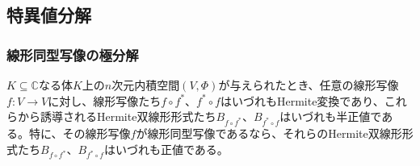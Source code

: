 \documentclass[dvipdfmx]{jsarticle}
\begin{document}
\subsection{特異値分解}%
\subsubsection{線形同型写像の極分解}%
\begin{thm}\label{2.3.11.1}
$K \subseteq \mathbb{C}$なる体$K$上の$n$次元内積空間$(V,\varPhi)$が与えられたとき、任意の線形写像$f:V \rightarrow V$に対し、線形写像たち$f \circ f^{*}$、$f^{*} \circ f$はいづれもHermite変換であり、これらから誘導されるHermite双線形形式たち$B_{f \circ f^{*}}$、$B_{f^{*} \circ f}$はいづれも半正値である。特に、その線形写像$f$が線形同型写像であるなら、それらのHermite双線形形式たち$B_{f \circ f^{*}}$、$B_{f^{*} \circ f}$はいづれも正値である。
\end{thm}
\end{document}
